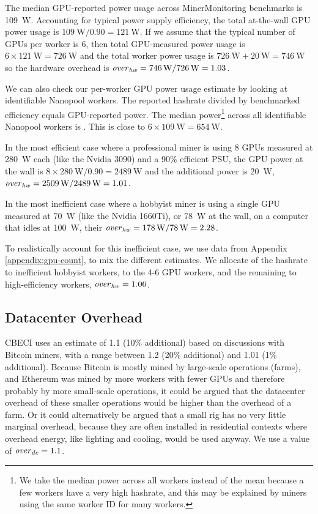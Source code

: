The median GPU-reported power usage across MinerMonitoring benchmarks is \SI{109}{\watt}. Accounting for typical power supply efficiency, the total at-the-wall GPU power usage is $\SI{109}{\watt} / 0.90 = \SI{121}{\watt}$. If we assume that the typical number of GPUs per worker is 6, then total GPU-measured power usage is $6 \times \SI{121}{\watt} = \SI{726}{\watt}$ and the total worker power usage is $\SI{726}{\watt} + \SI{20}{\watt} = \SI{746}{\watt}$ so the hardware overhead is $\mathit{over}_\mathit{hw} = \SI{746}{\watt} / \SI{726}{\watt} = 1.03$.

We can also check our per-worker GPU power usage estimate by looking at identifiable Nanopool workers. The reported hashrate divided by benchmarked efficiency equals GPU-reported power. The median power\footnote{We take the median power across all workers instead of the mean because a few workers have a very high hashrate\cite{nanopool_0xd70d_nodate}, and this may be explained\cite{majestyle1_last_2021} by miners using the same worker ID for many workers.} across all identifiable Nanopool workers is . This is close to $6 \times \SI{109}{\watt} = \SI{654}{\watt}$.

In the most efficient case where a professional miner is using 8 GPUs measured at \SI{280}{\watt} each (like the Nvidia 3090) and a 90\% efficient PSU, the GPU power at the wall is $8 \times \SI{280}{\watt} / 0.90 = \SI{2489}{\watt}$ and the additional power is \SI{20}{\watt}, $\mathit{over}_\mathit{hw} = \SI{2509}{\watt} / \SI{2489}{\watt} = 1.01$.

In the most inefficient case where a hobbyist miner is using a single GPU measured at \SI{70}{\watt} (like the Nvidia 1660Ti), or \SI{78}{\watt} at the wall, on a computer that idles at \SI{100}{\watt}, their $\mathit{over}_\mathit{hw} = \SI{178}{\watt} / \SI{78}{\watt} = 2.28$.

To realistically account for this inefficient case, we use data from Appendix \ref{appendix:gpu-count}, to mix the different estimates. We allocate  of the hashrate to inefficient hobbyist workers,  to the 4-6 GPU workers, and the remaining  to high-efficiency workers, $\mathit{over}_\mathit{hw} = 1.06$.

\subsection{Datacenter Overhead}

CBECI uses an estimate of 1.1 (10\% additional) based on discussions with Bitcoin miners, with a range between 1.2 (20\% additional) and 1.01 (1\% additional). Because Bitcoin is mostly mined by large-scale operations (farms), and Ethereum was mined by more workers with fewer GPUs and therefore probably by more small-scale operations, it could be argued that the datacenter overhead of these smaller operations would be higher than the overhead of a farm. Or it could alternatively be argued that a small rig has no very little marginal overhead, because they are often installed in residential contexts where overhead energy, like lighting and cooling, would be used anyway. We use a value of $\mathit{over}_\mathit{dc}=1.1$.

